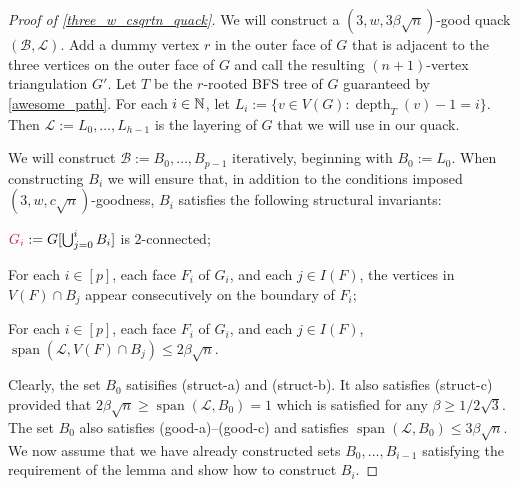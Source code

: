 \documentclass{patmorin}
\makeatletter
\def\mathcolor#1#{\@mathcolor{#1}}
\def\@mathcolor#1#2#3{%
  \protect\leavevmode
  \begingroup
    \color#1{#2}#3%
  \endgroup
}
\newcommand{\mathdefin}[1]{\mathcolor{brightmaroon}{#1}}
\DeclareMathOperator{\spn}{span}
\DeclareMathOperator{\depth}{depth}
\makeatother
\begin{document}
\begin{proof}[Proof of \cref{three_w_csqrtn_quack}]
  We will construct a  $(3,w,3\beta\sqrt{n})$-good quack $(\mathcal{B},\mathcal{L})$.
  Add a dummy vertex $r$ in the outer face of $G$ that is adjacent to the three vertices on the outer face of $G$ and call the resulting $(n+1)$-vertex triangulation $G'$.  Let $T$ be the $r$-rooted BFS tree of $G$ guaranteed by \cref{awesome_path}.  For each $i\in\mathbb{N}$, let $L_i:=\{v\in V(G):\depth_T(v)-1=i\}$.  Then $\mathcal{L}:=L_0,\ldots,L_{h-1}$ is the layering of $G$ that we will use in our quack.

  We will construct $\mathcal{B}:=B_0,\ldots,B_{p-1}$ iteratively, beginning with $B_0:=L_0$.  When constructing $B_i$ we will ensure that, in addition to the conditions imposed $(3,w,c\sqrt{n})$-goodness, $B_i$ satisfies the following structural invariants:
  \begin{compactenum}[({struct}-a)]
    \item $\mathdefin{G_i}:=G[\bigcup_{j=0}^i B_i]$ is $2$-connected;
    \item For each $i\in[p]$, each face $F_i$ of $G_i$, and each $j\in I(F)$,  the vertices in $V(F)\cap B_j$ appear consecutively on the boundary of $F_i$;
    \item For each $i\in[p]$, each face $F_i$ of $G_i$, and each $j\in I(F)$, $\spn(\mathcal{L},V(F)\cap B_j)\le 2\beta\sqrt{n}$.
  \end{compactenum}

  Clearly, the set $B_0$ satisifies (struct-a) and (struct-b). It also satisfies (struct-c) provided that $2\beta\sqrt{n} \ge \spn(\mathcal{L},B_0)=1$ which is satisfied for any $\beta\ge 1/2\sqrt{3}$.  The set $B_0$ also satisfies (good-a)--(good-c) and satisfies $\spn(\mathcal{L},B_0)\le 3\beta\sqrt{n}$.  We now assume that we have already constructed sets $B_0,\ldots,B_{i-1}$ satisfying the requirement of the lemma and show how to construct $B_i$.


\end{proof}
\end{document}
